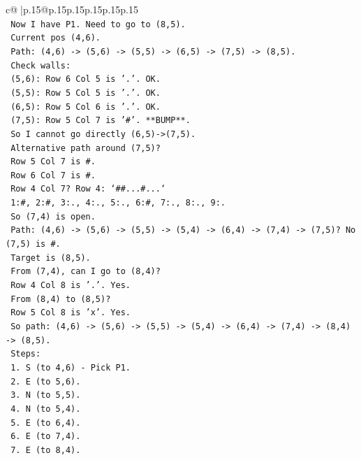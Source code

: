 \documentclass{article}
\begin{document}
{\begin{supertabular}{c@{$\;$}|p{.15\linewidth}@{}p{.15\linewidth}p{.15\linewidth}p{.15\linewidth}p{.15\linewidth}p{.15\linewidth}}
{{{\\ 
\texttt{   Now I have P1. Need to go to (8,5).} \\
\texttt{   Current pos (4,6).} \\
\texttt{   Path: (4,6) {-}> (5,6) {-}> (5,5) {-}> (6,5) {-}> (7,5) {-}> (8,5).} \\
\texttt{   Check walls:} \\
\texttt{   (5,6): Row 6 Col 5 is '.'. OK.} \\
\texttt{   (5,5): Row 5 Col 5 is '.'. OK.} \\
\texttt{   (6,5): Row 5 Col 6 is '.'. OK.} \\
\texttt{   (7,5): Row 5 Col 7 is '\#'. **BUMP**.} \\
\texttt{   So I cannot go directly (6,5){-}>(7,5).} \\
\texttt{   Alternative path around (7,5)?} \\
\texttt{   Row 5 Col 7 is \#.} \\
\texttt{   Row 6 Col 7 is \#.} \\
\texttt{   Row 4 Col 7? Row 4: `\#\#...\#...`} \\
\texttt{   1:\#, 2:\#, 3:., 4:., 5:., 6:\#, 7:., 8:., 9:.} \\
\texttt{   So (7,4) is open.} \\
\texttt{   Path: (4,6) {-}> (5,6) {-}> (5,5) {-}> (5,4) {-}> (6,4) {-}> (7,4) {-}> (7,5)? No (7,5) is \#.} \\
\texttt{   Target is (8,5).} \\
\texttt{   From (7,4), can I go to (8,4)?} \\
\texttt{   Row 4 Col 8 is '.'. Yes.} \\
\texttt{   From (8,4) to (8,5)?} \\
\texttt{   Row 5 Col 8 is 'x'. Yes.} \\
\texttt{   So path: (4,6) {-}> (5,6) {-}> (5,5) {-}> (5,4) {-}> (6,4) {-}> (7,4) {-}> (8,4) {-}> (8,5).} \\
\texttt{   Steps:} \\
\texttt{   1. S (to 4,6) {-} Pick P1.} \\
\texttt{   2. E (to 5,6).} \\
\texttt{   3. N (to 5,5).} \\
\texttt{   4. N (to 5,4).} \\
\texttt{   5. E (to 6,4).} \\
\texttt{   6. E (to 7,4).} \\
\texttt{   7. E (to 8,4).} \\
}}}
\end{supertabular}}
\end{document}
